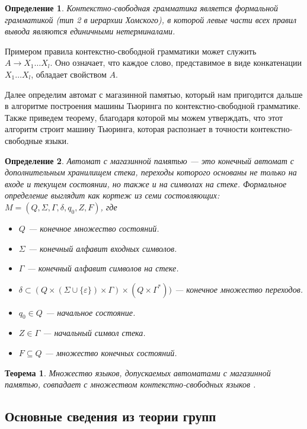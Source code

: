 \documentclass[14pt]{matmex-diploma-custom}
\newtheorem{thm}{Теорема}[subsection]
\newtheorem{defn}{Определение}[subsection]
\begin{document}
\begin{defn}
Контекстно-свободная грамматика является формальной грамматикой
(тип 2 в иерархии Хомского), в которой левые части всех правил вывода 
являются единичными нетерминалами. 
\end{defn}

Примером правила контекстно-свободной грамматики может служить $A \to X_1 \dots X_l$.
Оно означает, что каждое слово, представимое в виде конкатенации $X_1 \dots X_l$, 
обладает свойством $A$.

Далее определим автомат с магазинной памятью, который нам пригодится дальше в алгоритме
построения машины Тьюринга по контекстно-свободной грамматике. Также приведем теорему, благодаря которой мы можем
утверждать, что этот алгоритм строит машину Тьюринга, которая распознает в точности контекстно-свободные
языки.

\begin{defn}
Автомат с магазинной памятью --- это конечный автомат с дополнительным хранилищем стека, 
переходы которого основаны не только на входе и текущем состоянии, но также и на символах на стеке. 
Формальное определение выглядит как кортеж из семи состовляющих:
$M=(Q,\Sigma ,\Gamma ,\delta ,q_{0},Z,F)$, где
\begin{itemize}
    \item $Q$ --- конечное множество состояний.
    \item $\Sigma$ --- конечный алфавит входных символов. 
    \item $\Gamma$ --- конечный алфавит символов на стеке.
    \item $\delta \subset (Q \times (\Sigma \cup \{\varepsilon \})\times \Gamma) \times (Q\times \Gamma^{*}))$ --- конечное множество переходов.
    \item $q_{0}\in Q$ --- начальное состояние.
    \item $Z\in \Gamma$ --- начальный символ стека.
    \item $F\subseteq Q$ --- множество конечных состояний.
\end{itemize}
\end{defn}

\begin{thm} \label{thmpda}
Множество языков, допускаемых автоматами с магазинной памятью, совпадает с множеством контекстно-свободных языков \cite{hopcroft2013introduction}.
\end{thm}

\subsection{Основные сведения из теории групп}
\end{document}
